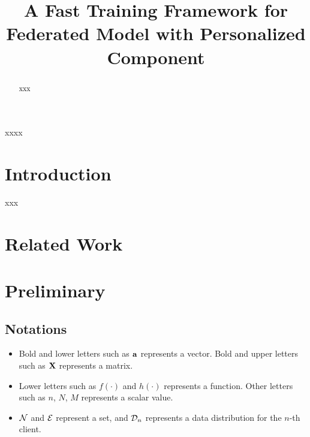 \documentclass[journal]{IEEEtran}
\begin{document}
\title{A Fast Training Framework for Federated Model with Personalized Component}





\maketitle

\begin{abstract}
xxx

\end{abstract}

\begin{IEEEkeywords}
xxxx
\end{IEEEkeywords}


\IEEEpeerreviewmaketitle


\section{Introduction}
\label{sect_introduction}
xxx



\section{Related Work}



\section{Preliminary}


\subsection{Notations}

\begin{itemize}
\item Bold and lower letters such as ${\bf a}$ represents a vector. Bold and upper letters such as ${\bf X}$ represents a matrix.
\item Lower letters such as $f(\cdot)$ and $h(\cdot)$ represents a function. Other letters such as $n$, $N$, $M$ represents a scalar value.
\item ${\mathcal{N}}$ and ${\mathcal{E}}$ represent a set, and $\mathcal{D}_n$ represents a data distribution for the $n$-th client.
\end{itemize}
\end{document}
